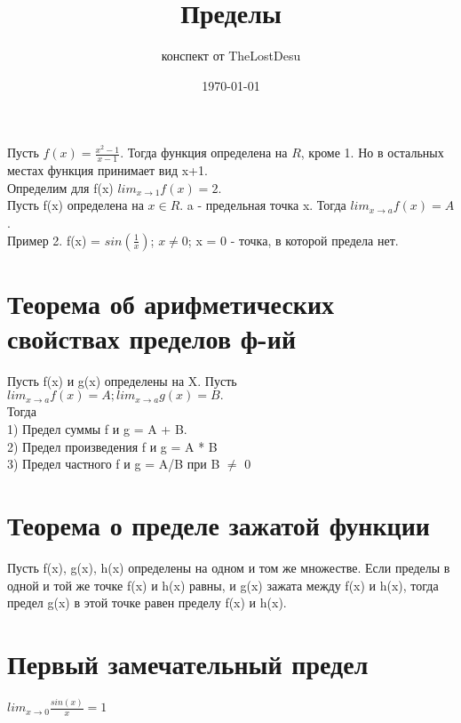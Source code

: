 \documentclass[a4paper,12pt]{article}
\author{конспект от TheLostDesu}
\title{Пределы}
\date{\today}
\begin{document}
\maketitle
\section{}
Пусть $f(x) = \frac{x^2-1}{x-1}$. Тогда функция определена на $R$, кроме 1. Но в остальных местах функция принимает вид x+1.\\
Определим для f(x) $lim_{x \to 1} f(x) = 2$.\\
Пусть f(x) определена на  $x \in R$. a - предельная точка x. Тогда $lim_{x \to a} f(x) = A$.\\
Пример 2. f(x) = $sin(\frac{1}{x})$; $x \neq 0$; x = 0 - точка, в которой предела нет. 
\section{Теорема об арифметических свойствах пределов ф-ий}
Пусть f(x) и g(x) определены на X. Пусть $lim_{x \to a} f(x) = A; lim_{x \to a} g(x) = B. $\\
Тогда \\
1) Предел суммы f и g = A + B.\\
2) Предел произведения f и g = A * B\\
3) Предел частного f и g = A/B при B $\neq$ 0\\
\section{Теорема о пределе зажатой функции}
Пусть f(x), g(x), h(x) определены на одном и том же множестве. Если пределы в одной и той же точке f(x) и h(x) равны, и g(x) зажата между f(x) и h(x), тогда предел g(x) в этой точке равен пределу f(x) и h(x).
\section{Первый замечательный предел}
$lim_{x \to 0} \frac{sin(x)}{x} = 1$
\end{document}
